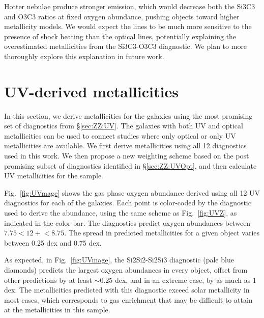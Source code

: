 Hotter nebulae produce stronger \ciii emission, which would decrease both the Si3C3 and O3C3 ratios at fixed oxygen abundance, pushing objects toward higher metallicity models. We would expect the \ciii lines to be much more sensitive to the presence of shock heating than the optical \oiii lines, potentially explaining the overestimated metallicities from the Si3C3-O3C3 diagnostic. We plan to more thoroughly explore this explanation in future work.


\section{UV-derived metallicities}\label{sec:UVZ}

In this section, we derive metallicities for the \mage galaxies using the most promising set of diagnostics from \S\ref{sec:ZZ:UV}. The \mage galaxies with both UV and optical metallicities can be used to connect studies where only optical or only UV metallicities are available. We first derive metallicities using all 12 diagnostics used in this work. We then propose a new weighting scheme based on the post promising subset of diagnostics identified in \S\ref{sec:ZZ:UVOpt}, and then calculate UV metallicities for the \mage sample.

Fig.~\ref{fig:UVmage} shows the gas phase oxygen abundance derived using all 12 UV diagnostics for each of the \mage galaxies. Each point is color-coded by the diagnostic used to derive the abundance, using the same scheme as Fig.~\ref{fig:UVZ}, as indicated in the color bar. The diagnostics predict oxygen abundances between $7.75< 12+$\logOH$<8.75$. The spread in predicted metallicities for a given object varies between 0.25 dex and 0.75 dex.

As expected, in Fig.~\ref{fig:UVmage}, the Si2Si2-Si2Si3 diagnostic (pale blue diamonds) predicts the largest oxygen abundances in every object, offset from other predictions by at least $\sim0.25$ dex, and in an extreme case, by as much as 1\,dex. The metallicities predicted with this diagnostic exceed solar metallicity in most cases, which corresponds to gas enrichment that may be difficult to attain at the metallicities in this sample.

